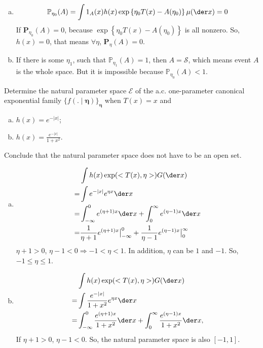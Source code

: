 \begin{solution}
	\begin{enumerate}[(a)]
		\item \[\mathbb{P}_{\eta_0}(A)=\int1_{A}(x)h(x)\exp\left\{\eta_0T(x)-A(\eta_0)\right\}\mu(\der x)=0\]
		If $\mathbf{P}_{\eta_0}(A)=0$, because $\exp\left\{\eta_0T(x)-A(\eta_0)\right\}$ is all nonzero. So, $h(x)=0$, that means $\forall \eta$, $\mathbf{P}_{\eta}(A)=0$.
		\item If there is some $\eta_1$, such that $\mathbb{P}_{\eta_1}(A)=1$, then $A=\mathcal{S}$, which means event $A$ is the whole space. But it is impossible because $\mathbb{P}_{\eta_0}(A)<1$.
	\end{enumerate}
\end{solution}

\begin{ex}
	Determine the natural parameter space \(\mathcal{E}\) of the a.c. one-parameter canonical exponential family \(\{f(. \mid \boldsymbol{\eta})\}_{\boldsymbol{\eta}}\) when \(T(x)=x\) and
	\begin{enumerate}[(a)]
		\item \(h(x)=e^{-|x|}\);
		\item \(h(x)=\frac{e^{-|x|}}{1+x^{2}}\).
	\end{enumerate}
	Conclude that the natural parameter space does not have to be an open set.
\end{ex}

\begin{solution}
	\begin{enumerate}[(a)]
		\item \begin{align*}
			&\int h(x)\exp(<T(x), \eta>)G(\der x)\\
			=&{}\int e^{-|x|}e^{\eta x}\der x\\
			=&{}\int_{-\infty}^0 e^{(\eta+1) x}\der x+ \int_{0}^\infty e^{(\eta-1) x}\der x\\
			=&{}\frac{1}{\eta+1}e^{(\eta+1) x}\big|_{-\infty}^0+\frac{1}{\eta-1}e^{(\eta-1)x}\big|_0^{\infty}
		\end{align*}
		$\eta+1>0$, $\eta-1<0\Rightarrow -1<\eta<1$. In addition, $\eta$ can be $1$ and $-1$. So, $-1\leqslant\eta\leqslant1$.
		\item \begin{align*}
			&\int h(x)\exp(<T(x), \eta>)G(\der x)\\
			=&{}\int \frac{e^{-|x|}}{1+x^2}e^{\eta x}\der x\\
			=&{}\int_{-\infty}^0 \frac{e^{(\eta+1) x}}{1+x^2}\der x+ \int_{0}^\infty \frac{e^{(\eta-1) x}}{1+x^2}\der x,
		\end{align*}
		If $\eta+1>0$, $\eta-1<0$. So, the natural parameter space is also $[-1,1]$.
	\end{enumerate}
\end{solution}


